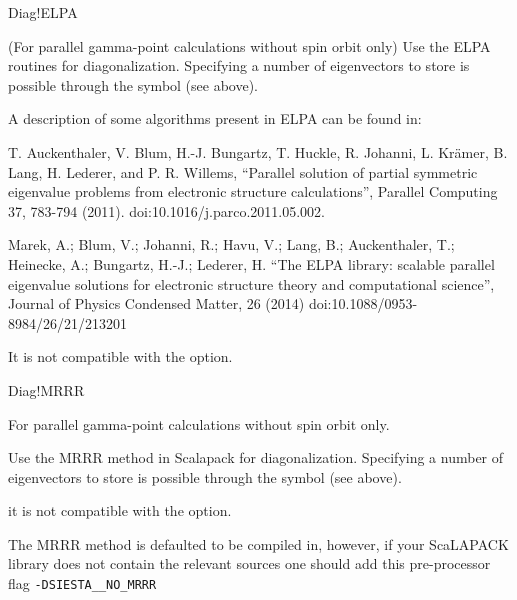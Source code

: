 \begin{fdflogicalF}{Diag!ELPA}

  (For parallel gamma-point calculations without spin orbit only) Use
  the ELPA routines for diagonalization.  Specifying a number of
  eigenvectors to store is possible through the symbol
   (see above).

  A description of some algorithms present in ELPA can be found in:

  T. Auckenthaler, V. Blum, H.-J. Bungartz, T. Huckle, R. Johanni,
  L. Kr\"amer, B. Lang, H. Lederer, and P. R. Willems, ``Parallel
  solution of partial symmetric eigenvalue problems from electronic
  structure calculations'', Parallel Computing 37, 783-794 (2011).
  doi:10.1016/j.parco.2011.05.002.

  Marek, A.; Blum, V.; Johanni, R.; Havu, V.; Lang, B.; Auckenthaler,
  T.; Heinecke, A.; Bungartz, H.-J.; Lederer, H.  ``The ELPA library:
  scalable parallel eigenvalue solutions for electronic structure
  theory and computational science'', Journal of Physics Condensed
  Matter, 26 (2014) doi:10.1088/0953-8984/26/21/213201

  \note It is not compatible with the 
  option.
  
\end{fdflogicalF}

\begin{fdflogicalF}{Diag!MRRR}

  For parallel gamma-point calculations without spin orbit only.

  Use the MRRR method in Scalapack for diagonalization. Specifying a
  number of eigenvectors to store is possible through the symbol
   (see above).

  \note it is not compatible with the 
  option.

  \note The MRRR method is defaulted to be compiled in, however, if
  your ScaLAPACK library does not contain the relevant sources one
  should add this pre-processor flag \texttt{-DSIESTA\_\_NO\_MRRR}
\end{fdflogicalF}


